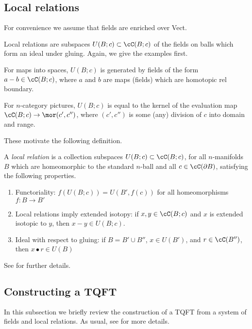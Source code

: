 \subsection{Local relations}
\label{sec:local-relations}

For convenience we assume that fields are enriched over Vect.

Local relations are subspaces $U(B; c)\sub \cC(B; c)$ of the fields on balls which form an ideal under gluing.
Again, we give the examples first.

\addtocounter{prop}{-2}
\begin{example}[contd.]
For maps into spaces, $U(B; c)$ is generated by fields of the form $a-b \in \lf(B; c)$,
where $a$ and $b$ are maps (fields) which are homotopic rel boundary.
\end{example}

\begin{example}[contd.]
For $n$-category pictures, $U(B; c)$ is equal to the kernel of the evaluation map
$\lf(B; c) \to \mor(c', c'')$, where $(c', c'')$ is some (any) division of $c$ into
domain and range.
\end{example}

These motivate the following definition.

\begin{defn}
A {\it local relation} is a collection subspaces $U(B; c) \sub \lf(B; c)$,
for all $n$-manifolds $B$ which are
homeomorphic to the standard $n$-ball and all $c \in \cC(\bd B)$, 
satisfying the following properties.
\begin{enumerate}
\item Functoriality: 
$f(U(B; c)) = U(B', f(c))$ for all homeomorphisms $f: B \to B'$
\item Local relations imply extended isotopy: 
if $x, y \in \cC(B; c)$ and $x$ is extended isotopic 
to $y$, then $x-y \in U(B; c)$.
\item Ideal with respect to gluing:
if $B = B' \cup B''$, $x\in U(B')$, and $r\in \cC(B'')$, then $x\bullet r \in U(B)$
\end{enumerate}
\end{defn}
See \cite{kw:tqft} for further details.


\subsection{Constructing a TQFT}
\label{sec:constructing-a-tqft}

In this subsection we briefly review the construction of a TQFT from a system of fields and local relations.
As usual, see \cite{kw:tqft} for more details.

